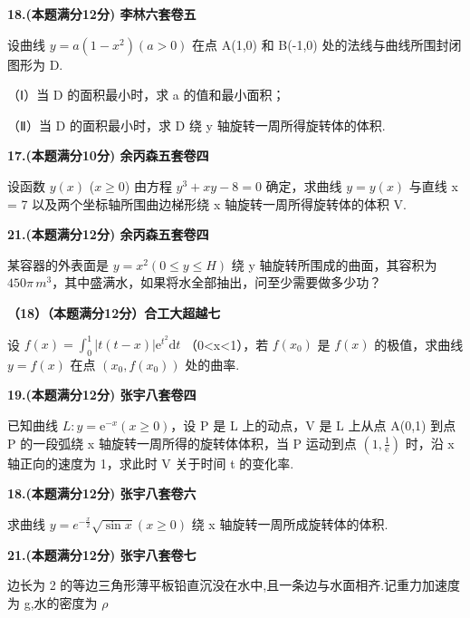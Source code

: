 \documentclass[a4paper,12pt]{article}
\begin{document}
\vspace{0.5cm}

\textbf{18.(本题满分12分) 李林六套卷五}

设曲线 $y=a(1-x^{2})(a>0)$ 在点 A(1,0) 和 B(-1,0) 处的法线与曲线所围封闭图形为 D.

（Ⅰ）当 D 的面积最小时，求 a 的值和最小面积；

（Ⅱ）当 D 的面积最小时，求 D 绕 y 轴旋转一周所得旋转体的体积.

\vspace{0.5cm}

\textbf{17.(本题满分10分) 余丙森五套卷四}

设函数 $ y(x) $ ($x \geqslant 0$) 由方程 $y^{3} + xy - 8 = 0$ 确定，求曲线 $ y = y(x) $ 与直线 x = 7 以及两个坐标轴所围曲边梯形绕 x 轴旋转一周所得旋转体的体积 V.

\vspace{0.5cm}

\textbf{21.(本题满分12分) 余丙森五套卷四}

某容器的外表面是 $y = x^{2} (0 \leqslant y \leqslant H)$ 绕 y 轴旋转所围成的曲面，其容积为 $450\pi \, m^{3}$，其中盛满水，如果将水全部抽出，问至少需要做多少功？

\vspace{0.5cm}

\textbf{（18）（本题满分12分）合工大超越七}

设 $f(x)=\int_{0}^{1}|t(t-x)|\mathrm{e}^{t^{2}}\mathrm{d}t$ （0<x<1），若 $f(x_{0})$ 是 $f(x)$ 的极值，求曲线 $y=f(x)$ 在点 $(x_{0},f(x_{0}))$ 处的曲率.

\vspace{0.5cm}

\textbf{19.(本题满分12分) 张宇八套卷四}

已知曲线 $L:y=\mathrm{e}^{-x}(x\geqslant0)$，设 P 是 L 上的动点，V 是 L 上从点 A(0,1) 到点 P 的一段弧绕 x 轴旋转一周所得的旋转体体积，当 P 运动到点 $\left(1,\frac{1}{\mathrm{e}}\right)$ 时，沿 x 轴正向的速度为 1，求此时 V 关于时间 t 的变化率.

\vspace{0.5cm}

\textbf{18.(本题满分12分) 张宇八套卷六}

求曲线 $y = e^{-\frac{x}{2}} \sqrt{\sin x} (x \geqslant 0)$ 绕 x 轴旋转一周所成旋转体的体积.

\vspace{0.5cm}

\textbf{21.(本题满分12分) 张宇八套卷七}

边长为 2 的等边三角形薄平板铅直沉没在水中,且一条边与水面相齐.记重力加速度为 g,水的密度为 $\rho$
\end{document}

